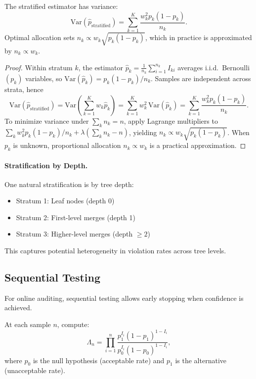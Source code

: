 \begin{theorem}
The stratified estimator has variance:
\[
\text{Var}(\hat{p}_{\text{stratified}}) = \sum_{k=1}^K \frac{w_k^2 p_k(1-p_k)}{n_k}.
\]
Optimal allocation sets $n_k \propto w_k \sqrt{p_k(1-p_k)}$, which in practice is approximated by $n_k \propto w_k$.
\end{theorem}

\begin{proof}
Within stratum $k$, the estimator $\hat p_k=\frac{1}{n_k}\sum_{i=1}^{n_k} I_{ki}$ averages i.i.d.\ Bernoulli$(p_k)$ variables, so
$\mathrm{Var}(\hat p_k)=p_k(1-p_k)/n_k$. Samples are independent across strata, hence
\[
\mathrm{Var}(\hat p_{\text{stratified}})=\mathrm{Var}\!\left(\sum_{k=1}^K w_k \hat p_k\right)
=\sum_{k=1}^K w_k^2\,\mathrm{Var}(\hat p_k)
=\sum_{k=1}^K \frac{w_k^2 p_k(1-p_k)}{n_k}.
\]
To minimize variance under $\sum_k n_k=n$, apply Lagrange multipliers to
$\sum_k w_k^2 p_k(1-p_k)/n_k+\lambda(\sum_k n_k-n)$, yielding
$n_k\propto w_k\sqrt{p_k(1-p_k)}$. When $p_k$ is unknown, proportional allocation
$n_k\propto w_k$ is a practical approximation.
\end{proof}

\paragraph{Stratification by Depth.}
One natural stratification is by tree depth:
\begin{itemize}[nosep]
    \item Stratum 1: Leaf nodes (depth 0)
    \item Stratum 2: First-level merges (depth 1)
    \item Stratum 3: Higher-level merges (depth $\ge 2$)
\end{itemize}
This captures potential heterogeneity in violation rates across tree levels.

\subsection{Sequential Testing}

For online auditing, sequential testing allows early stopping when confidence is achieved.

\begin{definition}
At each sample $n$, compute:
\[
\Lambda_n = \prod_{i=1}^n \frac{p_1^{I_i}(1-p_1)^{1-I_i}}{p_0^{I_i}(1-p_0)^{1-I_i}},
\]
where $p_0$ is the null hypothesis (acceptable rate) and $p_1$ is the alternative (unacceptable rate).
\end{definition}

